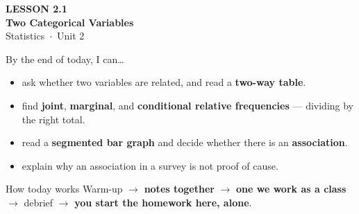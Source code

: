 \documentclass[aspectratio=169, 11pt]{beamer}
\begin{document}
{
\begin{frame}[plain]
  \vspace{2.8cm}\hspace{0.55cm}%
  \begin{minipage}{0.9\textwidth}
    {\color{goldacc}\bfseries\small LESSON 2.1}\\[0.5cm]
    {\color{white}\bfseries\LARGE Two Categorical Variables}\\[1.2cm]
    {\color{skymid}\small Statistics~$\cdot$~Unit 2}
  \end{minipage}
\end{frame}
}

\newcommand{\redink}[1]{{\color{redacc}\bfseries #1}}

\begin{frame}[t, plain]
  By the end of today, I can\ldots
  \begin{itemize}\setlength{\itemsep}{5pt}
    \item ask whether two variables are related, and read a \textbf{two-way table}.
    \item find \textbf{joint}, \textbf{marginal}, and \textbf{conditional relative
          frequencies} --- dividing by the right total.
    \item read a \textbf{segmented bar graph} and decide whether there is an
          \textbf{association}.
    \item explain why an association in a survey is not proof of cause.
  \end{itemize}
  \begin{block}{How today works}
    Warm-up $\to$ \textbf{notes together} $\to$ \textbf{one we work as a class} $\to$
    debrief $\to$ \textbf{you start the homework here, alone}.
  \end{block}
\end{frame}
\end{document}

